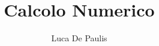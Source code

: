 \documentclass[
    oneside,
    10pt,
    language=italian,
    pagestyle=notes,
    fontstyle=palaeuler,
    thmstyle=boxed,
    colors
]{modernth}
\begin{document}
\author{Luca De Paulis}
\title{Calcolo Numerico}
\maketitle

\frontmatter{}
\tableofcontents

\mainmatter{}





\appendix


\end{document}
